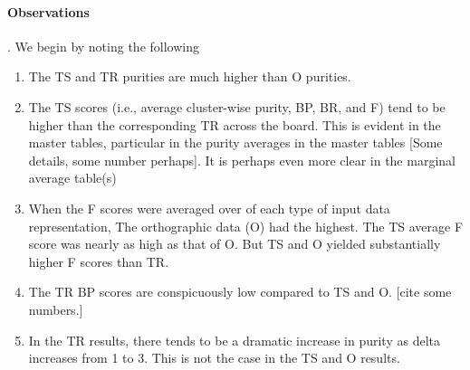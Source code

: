 \paragraph{Observations}. 
We begin by noting the following
\begin{enumerate}
\item The TS and TR purities are much higher than O purities.
\item The TS scores (i.e., average cluster-wise purity, BP, BR, and F) tend to be higher than the corresponding TR across the board. This is evident in the master tables, particular in the purity averages in the master tables [Some details, some number perhaps]. It is perhaps even more clear in the marginal average table(s)
\item When the F scores were averaged over of each type of input data representation, The orthographic data (O) had the highest. The TS  average F score was nearly as high as that of O. But TS and O yielded substantially higher F scores than TR.
\item The TR BP scores are conspicuously low compared to TS and O. [cite some numbers.]  %
\item In the TR results, there tends to be a dramatic increase in purity as delta increases from 1 to 3. This is not the case in the TS and O results.
\end{enumerate}

